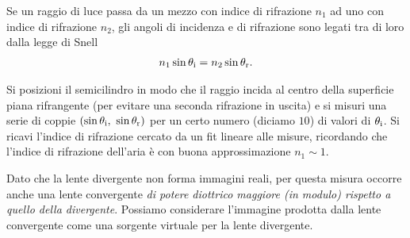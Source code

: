 \documentclass{lab1-article}
\begin{document}
\begin{article}
Se un raggio di luce passa da un mezzo con indice di rifrazione $n_1$ ad
uno con indice di rifrazione $n_2$, gli angoli di incidenza e di rifrazione
sono legati tra di loro dalla legge di Snell
\begin{align}
  n_1 \sin\theta_{\rm i} = n_2\sin\theta_{\rm r}.
\end{align}

Si posizioni il semicilindro in modo che il raggio incida al centro della
superficie piana rifrangente (per evitare una seconda rifrazione in uscita) e
si misuri una serie di coppie $(\sin\theta_{\rm i},~\sin\theta_{\rm r})$ per un
certo numero (diciamo $10$) di valori di $\theta_{\rm i}$.
Si ricavi l'indice di rifrazione cercato da un fit lineare alle misure,
ricordando che l'indice di rifrazione dell'aria \`e con buona approssimazione
$n_1 \sim 1$.



Dato che la lente divergente non forma immagini reali, per questa misura
occorre anche una lente convergente \emph{di potere diottrico maggiore (in
modulo) rispetto a quello della divergente}. Possiamo considerare l'immagine
prodotta dalla lente convergente come una sorgente virtuale per la lente
divergente.

\begin{figure}[htb!]
\begin{center}
\end{center}
\end{figure}
\end{article}
\end{document}
